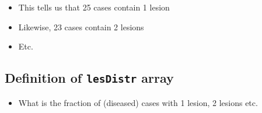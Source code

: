 \documentclass[
]{book}
\providecommand{\tightlist}{%
  \setlength{\itemsep}{0pt}\setlength{\parskip}{0pt}}
\begin{document}
\begin{itemize}
\tightlist
\item
  This tells us that 25 cases contain 1 lesion
\item
  Likewise, 23 cases contain 2 lesions
\item
  Etc.
\end{itemize}

\hypertarget{quick-start-froc-data-lesion-distribution}{%
\subsection{\texorpdfstring{Definition of \texttt{lesDistr} array}{Definition of lesDistr array}}\label{quick-start-froc-data-lesion-distribution}}

\begin{itemize}
\tightlist
\item
  What is the fraction of (diseased) cases with 1 lesion, 2 lesions etc.
\end{itemize}
\end{document}
